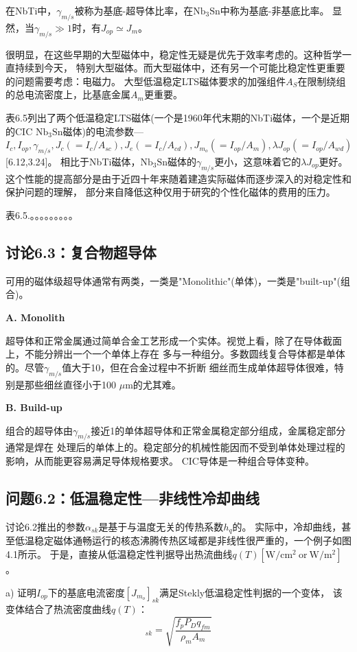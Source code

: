 在NbTi中，$\gamma_{m/s}$被称为基底-超导体比率，在$\mathrm{Nb_3Sn}$中称为基底-非基底比率。
显然，当$\gamma_{m/s}\gg 1$时，有$J_{op}\simeq J_m$。

很明显，在这些早期的大型磁体中，稳定性无疑是优先于效率考虑的。这种哲学一直持续到今天，
特别大型磁体。而大型磁体中，还有另一个可能比稳定性更重要的问题需要考虑：电磁力。
大型低温稳定LTS磁体要求的加强组件$A_S$在限制绕组的总电流密度上，比基底金属$A_m$更重要。

表6.5列出了两个低温稳定LTS磁体(一个是1960年代末期的NbTi磁体，一个是近期的CIC $\mathrm{Nb_3Sn}$磁体)的电流参数---$I_c,I_{op},\gamma_{m/s},J_c(=I_c/A_{sc}),J_e(=I_c/A_{cd}),
J_{m_o}(=I_{op}/A_m),\lambda J_{op}(=I_{op}/A_{wd})$[6.12,3.24]。
相比于NbTi磁体，$\mathrm{Nb_3Sn}$磁体的$\gamma_{m/s}$更小，这意味着它的$\lambda J_{op}$更好。
这个性能的提高部分是由于近四十年来随着建造实际磁体而逐步深入的对稳定性和保护问题的理解，
部分来自降低这种仅用于研究的个性化磁体的费用的压力。

表6.5.。。。。。。。。。

\subsection{讨论6.3：复合物超导体}
可用的磁体级超导体通常有两类，一类是"Monolithic"(单体)，一类是"built-up"(组合)。

\textbf{A. Monolith}

超导体和正常金属通过简单合金工艺形成一个实体。视觉上看，除了在导体截面上，不能分辨出一个一个单体上存在
多与一种组分。多数圆线复合导体都是单体的。尽管$\gamma_{m/s}$值大于10，但在合金过程中不折断
细丝而生成单体超导体很难，特别是那些细丝直径小于100 $\mu$m的尤其难。

\textbf{B. Build-up}

组合的超导体由$\gamma_{m/s}$接近1的单体超导体和正常金属稳定部分组成，金属稳定部分通常是焊在
处理后的单体上的。稳定部分的机械性能因而不受到单体处理过程的影响，从而能更容易满足导体规格要求。
CIC导体是一种组合导体变种。

\subsection{问题6.2：低温稳定性---非线性冷却曲线}
讨论6.2推出的参数$\alpha_{sk}$是基于与温度无关的传热系数$h_q$的。
实际中，冷却曲线，甚至低温稳定磁体通畅运行的核态沸腾传热区域都是非线性很严重的，一个例子如图4.1所示。
于是，直接从低温稳定性判据导出热流曲线$q(T)[\mathrm{W/cm^2\ or\ W/m^2}] $。

a) 证明$I_{op}$下的基底电流密度$[J_{m_o}]_{sk}$满足Stekly低温稳定性判据的一个变体，
该变体结合了热流密度曲线$q(T)$：
\begin{equation}%
[J_{m_o}]_{sk}=\sqrt{\frac{f_pP_Dq_{fm}}{\rho_mA_m}}
\end{equation}

